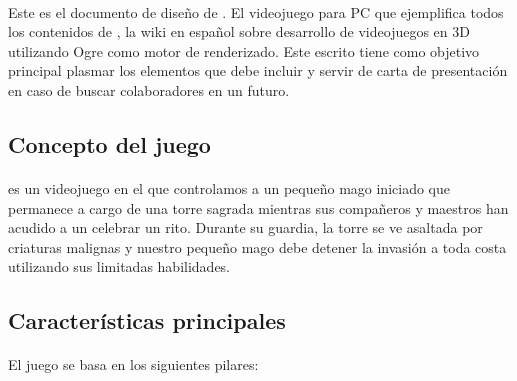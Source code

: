 \paragraph{}
Este es el documento de diseño de \juego. El videojuego para PC que 
ejemplifica todos los contenidos de \wiki, la wiki en español sobre desarrollo de videojuegos
en 3D utilizando Ogre como motor de renderizado. Este escrito tiene como
objetivo principal plasmar los elementos que debe incluir \juego y servir
de carta de presentación en caso de buscar colaboradores en un futuro.


\subsection{Concepto del juego}
\label{sec:int-concepto}

\paragraph{}
\juego es un videojuego en el que controlamos a un pequeño mago iniciado
que permanece a cargo de una torre sagrada mientras sus compañeros y 
maestros han acudido a un celebrar un rito. Durante su guardia, la torre
se ve asaltada por criaturas malignas y nuestro pequeño mago debe detener
la invasión a toda costa utilizando sus limitadas habilidades.

\subsection{Características principales}
\label{sec:int-caracteristicas}


\paragraph{}
El juego se basa en los siguientes pilares:

